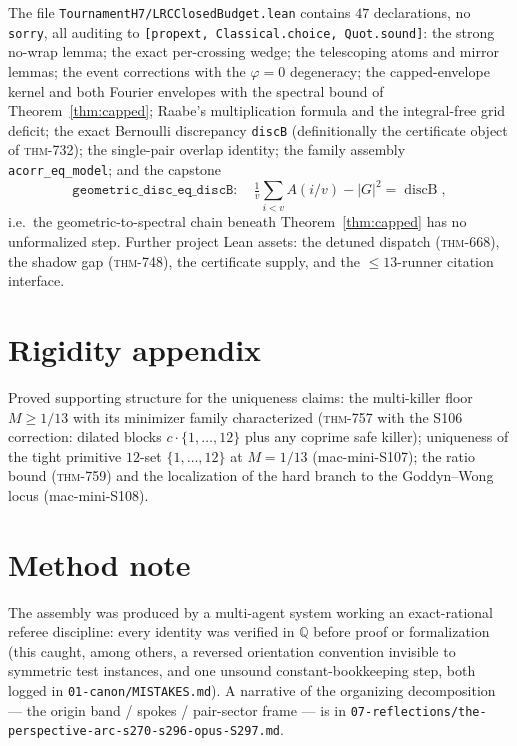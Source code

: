\documentclass[11pt]{article}
\theoremstyle{definition}
\newcommand{\Qb}{\mathbb{Q}}
\newcommand{\repo}[1]{\texttt{#1}}
\begin{document}
The file \repo{TournamentH7/LRCClosedBudget.lean} contains $47$ declarations, no
\texttt{sorry}, all auditing to \texttt{[propext, Classical.choice, Quot.sound]}:
the strong no-wrap lemma; the exact per-crossing wedge; the telescoping atoms and mirror
lemmas; the event corrections with the $\varphi=0$ degeneracy; the capped-envelope kernel
and both Fourier envelopes with the spectral bound of Theorem~\ref{thm:capped}; Raabe's
multiplication formula and the integral-free grid deficit; the exact Bernoulli discrepancy
\texttt{discB} (definitionally the certificate object of \textsc{thm}-732); the single-pair
overlap identity; the family assembly \texttt{acorr\_eq\_model}; and the capstone
\[
\texttt{geometric\_disc\_eq\_discB}:\quad
\tfrac1v\sum_{i<v}A(i/v)-|G|^2=\operatorname{discB},
\]
i.e.\ the geometric-to-spectral chain beneath Theorem~\ref{thm:capped} has no unformalized
step. Further project Lean assets: the detuned dispatch (\textsc{thm}-668), the shadow gap
(\textsc{thm}-748), the certificate supply, and the $\le13$-runner citation interface.

\section{Rigidity appendix}\label{sec:rigidity}

Proved supporting structure for the uniqueness claims: the multi-killer floor $M\ge 1/13$
with its minimizer family characterized (\textsc{thm}-757 with the S106 correction: dilated
blocks $c\cdot\{1,\dots,12\}$ plus any coprime safe killer); uniqueness of the tight
primitive $12$-set $\{1,\dots,12\}$ at $M=1/13$ (mac-mini-S107); the ratio bound
(\textsc{thm}-759) and the localization of the hard branch to the Goddyn--Wong locus
(mac-mini-S108).

\section{Method note}

The assembly was produced by a multi-agent system working an exact-rational referee
discipline: every identity was verified in $\Qb$ before proof or formalization (this caught,
among others, a reversed orientation convention invisible to symmetric test instances, and
one unsound constant-bookkeeping step, both logged in \repo{01-canon/MISTAKES.md}). A
narrative of the organizing decomposition --- the origin band / spokes / pair-sector frame
--- is in \repo{07-reflections/the-perspective-arc-s270-s296-opus-S297.md}.
\end{document}
